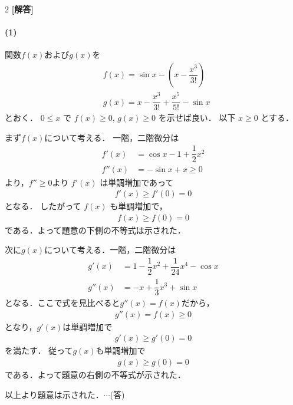 \documentclass[../../main.tex]{subfiles}
\begin{document}
\setcounter{equation}{0}
\begin{oframed}
  
\end{oframed}
\setlength{\columnseprule}{0.4pt}
\begin{multicols}{2}
  {\bf [解答]}
  \paragraph{(1)}
  関数$f(x)$および$g(x)$を
  \begin{align}
    & f(x) = \sin x - \left(x - \dfrac{x^3}{3!}\right)     \\
    & g(x) = x - \dfrac{x^3}{3!} + \dfrac{x^5}{5!} - \sin x
  \end{align}
  とおく．
  $0 \leq x$ で $f(x) \geq 0$, $g(x) \geq 0$ を示せば良い．
  以下 $x \geq 0$ とする．

  まず$f(x)$について考える．
  一階，二階微分は
  \begin{align}
    f'(x)  & = \cos x - 1 + \dfrac{1}{2}x^2 \\
    f''(x) & = -\sin x + x \geq 0
  \end{align}
  より，$f'' \geq 0$より $f'(x)$ は単調増加であって
  \begin{align}
    f'(x) \geq f'(0) = 0
  \end{align}
  となる．
  したがって $f(x)$ も単調増加で，
  \begin{align}
    f(x) \geq f(0) = 0
  \end{align}
  である．よって題意の下側の不等式は示された．

  次に$g(x)$について考える．一階，二階微分は
  \begin{align}
    g'(x)  & = 1 - \dfrac{1}{2}x^2 + \dfrac{1}{24}x^4 - \cos x \\
    g''(x) & = -x + \dfrac{1}{3}x^3 + \sin x
  \end{align}
  となる．ここで式を見比べると$g''(x)=f(x)$だから，
  \begin{align}
    g''(x) = f(x) \ge 0
  \end{align}
  となり，$g'(x)$は単調増加で
  \begin{align}
    g'(x) \geq g'(0)=0
  \end{align}
  を満たす．
  従って$g(x)$も単調増加で
  \begin{align}
    g(x) \geq g(0)=0
  \end{align}
  である．よって題意の右側の不等式が示された．

  以上より題意は示された．$\cdots$(答)


\end{multicols}
\end{document}
